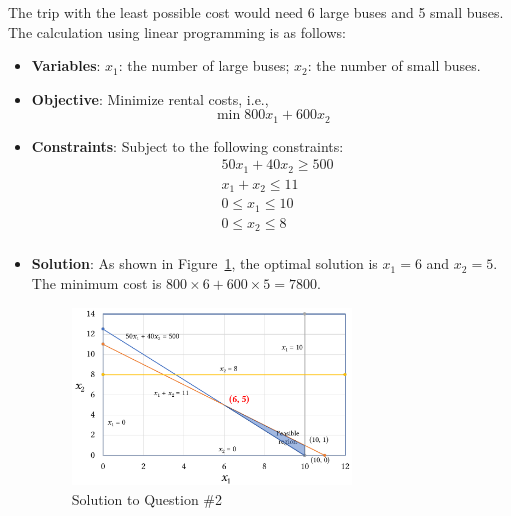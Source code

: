 \documentclass[conference]{styles/acmsiggraph}
\begin{document}
The trip with the least possible cost would need 6 large buses and 5 small buses.
The calculation using linear programming is as follows:
\begin{itemize}[leftmargin=*]
	\setlength{\itemsep}{0pt}
	\setlength{\parsep}{0pt}
	\setlength{\parskip}{0pt}
	\item \textbf{Variables}: $x_1$: the number of large buses; $x_2$: the number of small buses.
	\item \textbf{Objective}: Minimize rental costs, i.e.,
	\begin{equation}
		\min 800x_1 + 600 x_2
	\end{equation}
	\item \textbf{Constraints}: Subject to the following constraints:
	\begin{equation}
		\begin{aligned}
			& 50x_1 + 40x_2 \geq 500 \\
			& x_1 + x_2 \leq 11 \\
			& 0 \leq x_1 \leq 10 \\
			& 0 \leq x_2 \leq 8 \\
		\end{aligned}
	\end{equation}
	\item \textbf{Solution}: As shown in Figure~\ref{fig:2}, the optimal solution is $x_1 = 6$ and $x_2 = 5$. The minimum cost is $800 \times 6 + 600 \times 5 = 7800$.
	\begin{figure}
		\centering
		\includegraphics[width=0.7\textwidth]{figures/q2.pdf}
		\caption{Solution to Question \#2}
		\label{fig:2}
	\end{figure}
\end{itemize}
\end{document}
